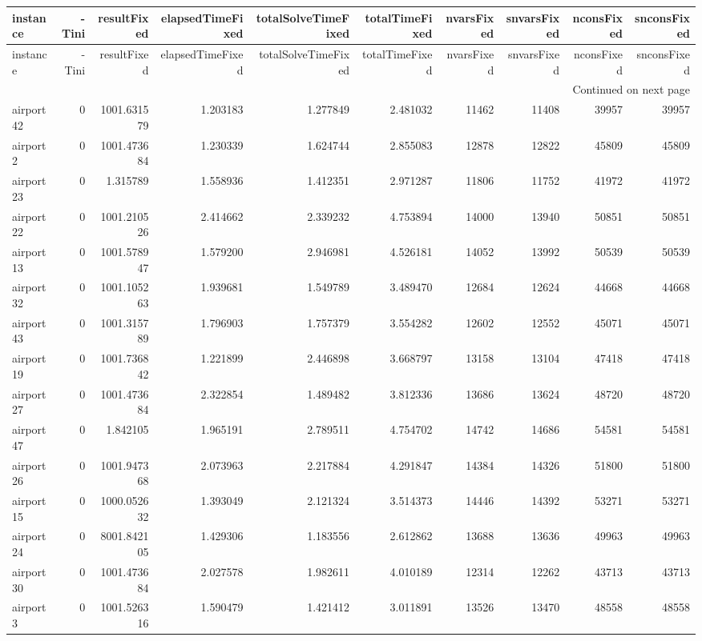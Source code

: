 \begin{longtable}{|l|r|r|r|r|r|r|r|r|r|}
\toprule
instance & -Tini & resultFixed & elapsedTimeFixed & totalSolveTimeFixed & totalTimeFixed & nvarsFixed & snvarsFixed & nconsFixed & snconsFixed \\
\midrule
\endfirsthead
\toprule
instance & -Tini & resultFixed & elapsedTimeFixed & totalSolveTimeFixed & totalTimeFixed & nvarsFixed & snvarsFixed & nconsFixed & snconsFixed \\
\midrule
\endhead
\midrule
\multicolumn{10}{r}{Continued on next page} \\
\midrule
\endfoot
\bottomrule
\endlastfoot
airport42 & 0 & 1001.631579 & 1.203183 & 1.277849 & 2.481032 & 11462 & 11408 & 39957 & 39957 \\
airport2 & 0 & 1001.473684 & 1.230339 & 1.624744 & 2.855083 & 12878 & 12822 & 45809 & 45809 \\
airport23 & 0 & 1.315789 & 1.558936 & 1.412351 & 2.971287 & 11806 & 11752 & 41972 & 41972 \\
airport22 & 0 & 1001.210526 & 2.414662 & 2.339232 & 4.753894 & 14000 & 13940 & 50851 & 50851 \\
airport13 & 0 & 1001.578947 & 1.579200 & 2.946981 & 4.526181 & 14052 & 13992 & 50539 & 50539 \\
airport32 & 0 & 1001.105263 & 1.939681 & 1.549789 & 3.489470 & 12684 & 12624 & 44668 & 44668 \\
airport43 & 0 & 1001.315789 & 1.796903 & 1.757379 & 3.554282 & 12602 & 12552 & 45071 & 45071 \\
airport19 & 0 & 1001.736842 & 1.221899 & 2.446898 & 3.668797 & 13158 & 13104 & 47418 & 47418 \\
airport27 & 0 & 1001.473684 & 2.322854 & 1.489482 & 3.812336 & 13686 & 13624 & 48720 & 48720 \\
airport47 & 0 & 1.842105 & 1.965191 & 2.789511 & 4.754702 & 14742 & 14686 & 54581 & 54581 \\
airport26 & 0 & 1001.947368 & 2.073963 & 2.217884 & 4.291847 & 14384 & 14326 & 51800 & 51800 \\
airport15 & 0 & 1000.052632 & 1.393049 & 2.121324 & 3.514373 & 14446 & 14392 & 53271 & 53271 \\
airport24 & 0 & 8001.842105 & 1.429306 & 1.183556 & 2.612862 & 13688 & 13636 & 49963 & 49963 \\
airport30 & 0 & 1001.473684 & 2.027578 & 1.982611 & 4.010189 & 12314 & 12262 & 43713 & 43713 \\
airport3 & 0 & 1001.526316 & 1.590479 & 1.421412 & 3.011891 & 13526 & 13470 & 48558 & 48558 \\

\end{longtable}
